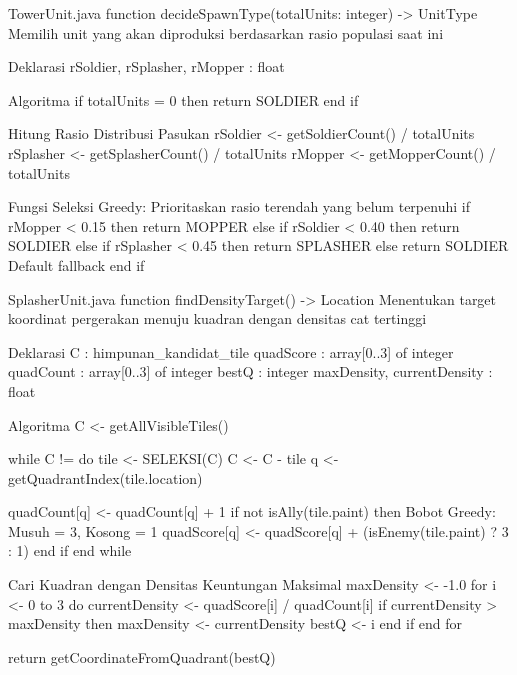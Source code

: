 \begin{pseudocode}{TowerUnit.java}
    function decideSpawnType(totalUnits: integer) -> UnitType
    { Memilih unit yang akan diproduksi berdasarkan rasio populasi saat ini }

    { Deklarasi }
    rSoldier, rSplasher, rMopper : float

    { Algoritma }
    if totalUnits = 0 then return SOLDIER end if

    { Hitung Rasio Distribusi Pasukan }
    rSoldier <- getSoldierCount() / totalUnits
    rSplasher <- getSplasherCount() / totalUnits
    rMopper <- getMopperCount() / totalUnits

    { Fungsi Seleksi Greedy: Prioritaskan rasio terendah yang belum terpenuhi }
    if rMopper < 0.15 then
        return MOPPER
    else if rSoldier < 0.40 then
        return SOLDIER
    else if rSplasher < 0.45 then
        return SPLASHER
    else
        return SOLDIER { Default fallback }
    end if
\end{pseudocode}

\begin{pseudocode}{SplasherUnit.java}
    function findDensityTarget() -> Location
    { Menentukan target koordinat pergerakan menuju kuadran dengan densitas cat tertinggi }

    { Deklarasi }
    C : himpunan_kandidat_tile
    quadScore : array[0..3] of integer
    quadCount : array[0..3] of integer
    bestQ : integer
    maxDensity, currentDensity : float

    { Algoritma }
    C <- getAllVisibleTiles()
    
    while C != {} do
        tile <- SELEKSI(C)
        C <- C - {tile}
        q <- getQuadrantIndex(tile.location)
        
        quadCount[q] <- quadCount[q] + 1
        if not isAlly(tile.paint) then
            { Bobot Greedy: Musuh = 3, Kosong = 1 }
            quadScore[q] <- quadScore[q] + (isEnemy(tile.paint) ? 3 : 1)
        end if
    end while

    { Cari Kuadran dengan Densitas Keuntungan Maksimal }
    maxDensity <- -1.0
    for i <- 0 to 3 do
        currentDensity <- quadScore[i] / quadCount[i]
        if currentDensity > maxDensity then
            maxDensity <- currentDensity
            bestQ <- i
        end if
    end for

    return getCoordinateFromQuadrant(bestQ)
\end{pseudocode}

